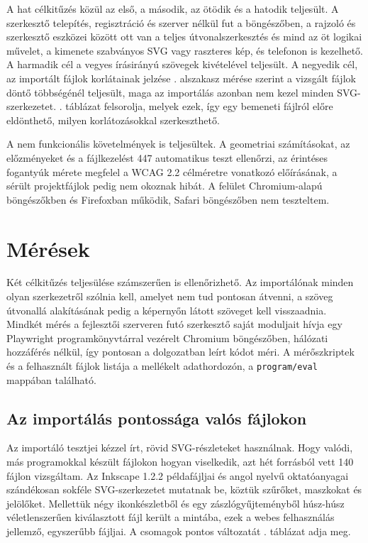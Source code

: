 A hat célkitűzés közül az első, a második, az ötödik és a hatodik teljesült. A szerkesztő telepítés, regisztráció és szerver nélkül fut a böngészőben, a rajzoló és szerkesztő eszközei között ott van a teljes útvonalszerkesztés és mind az öt logikai művelet, a kimenete szabványos SVG vagy raszteres kép, és telefonon is kezelhető. A harmadik cél a vegyes írásirányú szövegek kivételével teljesült. A negyedik cél, az importált fájlok korlátainak jelzése . alszakasz mérése szerint a vizsgált fájlok döntő többségénél teljesült, maga az importálás azonban nem kezel minden SVG-szerkezetet. . táblázat felsorolja, melyek ezek, így egy bemeneti fájlról előre eldönthető, milyen korlátozásokkal szerkeszthető.

A nem funkcionális követelmények is teljesültek. A geometriai számításokat, az előzményeket és a fájlkezelést 447 automatikus teszt ellenőrzi, az érintéses fogantyúk mérete megfelel a WCAG 2.2 célméretre vonatkozó előírásának, a sérült projektfájlok pedig nem okoznak hibát. A felület Chromium-alapú böngészőkben és Firefoxban működik, Safari böngészőben nem teszteltem.

\section{Mérések}
\label{sec:measurements}

Két célkitűzés teljesülése számszerűen is ellenőrizhető. Az importálónak minden olyan szerkezetről szólnia kell, amelyet nem tud pontosan átvenni, a szöveg útvonallá alakításának pedig a képernyőn látott szöveget kell visszaadnia. Mindkét mérés a fejlesztői szerveren futó szerkesztő saját moduljait hívja egy Playwright programkönyvtárral vezérelt Chromium böngészőben, hálózati hozzáférés nélkül, így pontosan a dolgozatban leírt kódot méri. A mérőszkriptek és a felhasznált fájlok listája a mellékelt adathordozón, a \texttt{program/eval} mappában található.

\subsection{Az importálás pontossága valós fájlokon}
\label{sec:import_study}

Az importáló tesztjei kézzel írt, rövid SVG-részleteket használnak. Hogy valódi, más programokkal készült fájlokon hogyan viselkedik, azt hét forrásból vett 140 fájlon vizsgáltam. Az Inkscape 1.2.2 példafájljai és angol nyelvű oktatóanyagai szándékosan sokféle SVG-szerkezetet mutatnak be, köztük szűrőket, maszkokat és jelölőket. Mellettük négy ikonkészletből és egy zászlógyűjteményből húsz-húsz véletlenszerűen kiválasztott fájl került a mintába, ezek a webes felhasználás jellemző, egyszerűbb fájljai. A csomagok pontos változatát . táblázat adja meg.

